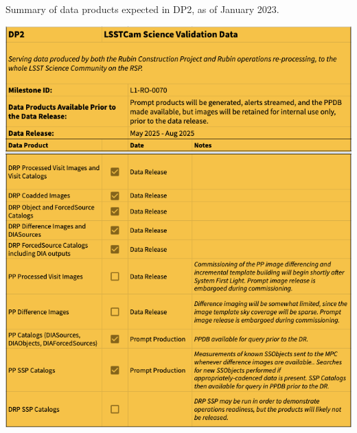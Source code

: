 \begin{table}
\caption{Summary of data products expected in DP2, as of January 2023.}
\label{tab:dp-two-products}
\includegraphics[width=\linewidth]{figures/DP2-products}
\end{table}

